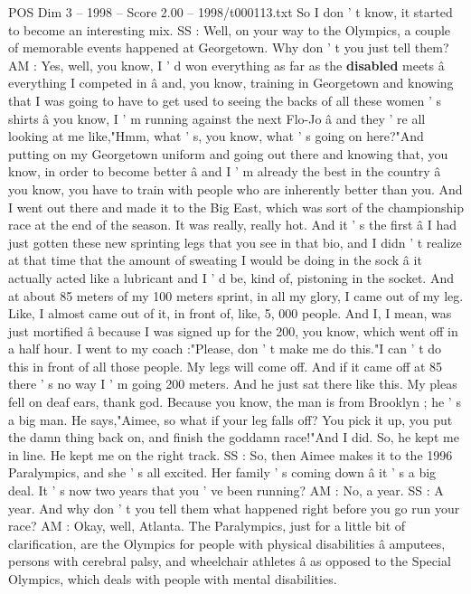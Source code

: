 \begin{textsample}{POS Dim 3 – 1998 – Score 2.00 – 1998/t000113.txt}
So I don ' t know, it started to become an interesting mix.
SS : Well, on your way to the Olympics, a couple of memorable events happened at Georgetown.
Why don ' t you just tell them?
AM : Yes, well, you know, I ' d won everything as far as the \textbf{disabled} meets â everything I competed in â and, you know, training in Georgetown and knowing that I was going to have to get used to seeing the backs of all these women ' s shirts â you know, I ' m running against the next Flo-Jo â and they ' re all looking at me like,"Hmm, what ' s, you know, what ' s going on here?"And putting on my Georgetown uniform and going out there and knowing that, you know, in order to become better â and I ' m already the best in the country â you know, you have to train with people who are inherently better than you.
And I went out there and made it to the Big East, which was sort of the championship race at the end of the season.
It was really, really hot.
And it ' s the first â I had just gotten these new sprinting legs that you see in that bio, and I didn ' t realize at that time that the amount of sweating I would be doing in the sock â it actually acted like a lubricant and I ' d be, kind of, pistoning in the socket.
And at about 85 meters of my 100 meters sprint, in all my glory, I came out of my leg.
Like, I almost came out of it, in front of, like, 5, 000 people.
And I, I mean, was just mortified â because I was signed up for the 200, you know, which went off in a half hour.
I went to my coach :"Please, don ' t make me do this."I can ' t do this in front of all those people.
My legs will come off.
And if it came off at 85 there ' s no way I ' m going 200 meters.
And he just sat there like this.
My pleas fell on deaf ears, thank god.
Because you know, the man is from Brooklyn ; he ' s a big man.
He says,"Aimee, so what if your leg falls off?
You pick it up, you put the damn thing back on, and finish the goddamn race!"And I did.
So, he kept me in line.
He kept me on the right track.
SS : So, then Aimee makes it to the 1996 Paralympics, and she ' s all excited.
Her family ' s coming down â it ' s a big deal.
It ' s now two years that you ' ve been running?
AM : No, a year.
SS : A year.
And why don ' t you tell them what happened right before you go run your race?
AM : Okay, well, Atlanta.
The Paralympics, just for a little bit of clarification, are the Olympics for people with physical disabilities â amputees, persons with cerebral palsy, and wheelchair athletes â as opposed to the Special Olympics, which deals with people with mental disabilities.

\end{textsample}
